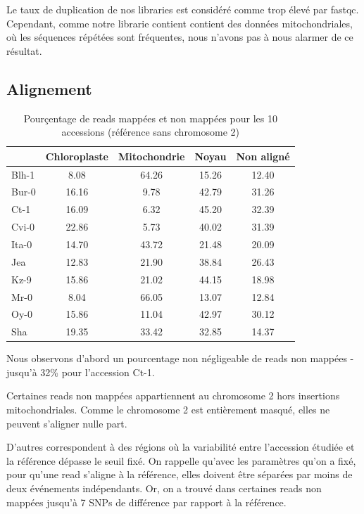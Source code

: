 \documentclass[a4paper]{article}
\begin{document}
Le taux de duplication de nos libraries est considéré comme trop élevé par fastqc. Cependant, comme notre librarie contient contient des données mitochondriales, où les séquences répétées sont fréquentes, nous n'avons pas à nous alarmer de ce résultat. 

\subsection{Alignement}

\begin{table}[H]
\centering
\begin{tabular}{|l|cccc|}
  \hline
 & Chloroplaste & Mitochondrie & Noyau & Non aligné \\ 
 \hline
Blh-1 & 8.08 & 64.26 & 15.26 & 12.40 \\ 
  Bur-0 & 16.16 & 9.78 & 42.79 & 31.26  \\ 
  Ct-1 & 16.09 & 6.32 & 45.20 & 32.39  \\ 
  Cvi-0 & 22.86 & 5.73 & 40.02 & 31.39  \\ 
  Ita-0 & 14.70 & 43.72 & 21.48 & 20.09  \\ 
  Jea & 12.83 & 21.90 & 38.84 & 26.43  \\ 
  Kz-9 & 15.86 & 21.02 & 44.15 & 18.98  \\ 
  Mr-0 & 8.04 & 66.05 & 13.07 & 12.84  \\ 
  Oy-0 & 15.86 & 11.04 & 42.97 & 30.12 \\ 
  Sha & 19.35 & 33.42 & 32.85 & 14.37 \\ 
  \hline
\end{tabular}
\caption{Pourçentage de reads mappées et non mappées pour les 10 accessions (référence sans chromosome 2)}
\end{table}

Nous observons d'abord un pourcentage non négligeable de reads non mappées - jusqu'à 32\% pour l'accession Ct-1. 

Certaines reads non mappées appartiennent au chromosome 2 hors insertions mitochondriales. Comme le chromosome 2 est entièrement masqué, elles ne peuvent s'aligner nulle part. 

D'autres correspondent à des régions où la variabilité entre l'accession étudiée et la référence dépasse le seuil fixé. On rappelle qu'avec les paramètres qu'on a fixé, pour qu'une read s'aligne à la référence, elles doivent être séparées par moins de deux événements indépendants. Or, on a trouvé dans certaines reads non mappées jusqu'à 7 SNPs de différence par rapport à la référence. 
\end{document}
